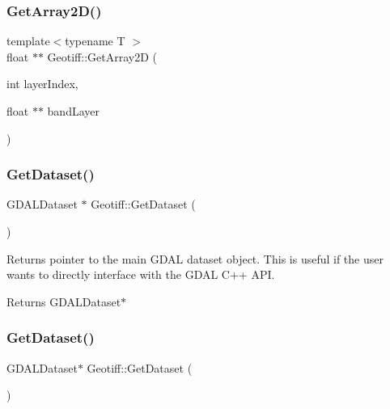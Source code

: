 \mbox{\label{class_geotiff_a922f027c08e3748239031119fb103543}} 
\subsubsection{\texorpdfstring{Get\+Array2\+D()}{GetArray2D()}\hspace{0.1cm}{\footnotesize\ttfamily [2/2]}}
{\footnotesize\ttfamily template$<$typename T $>$ \\
float $\ast$$\ast$ Geotiff\+::\+Get\+Array2D (\begin{DoxyParamCaption}\item[{int}]{layer\+Index,  }\item[{float $\ast$$\ast$}]{band\+Layer }\end{DoxyParamCaption})}

\mbox{\label{class_geotiff_a7494d80a2bf47222aabeb18cb8ff105b}} 
\subsubsection{\texorpdfstring{Get\+Dataset()}{GetDataset()}\hspace{0.1cm}{\footnotesize\ttfamily [1/2]}}
{\footnotesize\ttfamily G\+D\+A\+L\+Dataset $\ast$ Geotiff\+::\+Get\+Dataset (\begin{DoxyParamCaption}{ }\end{DoxyParamCaption})}



Returns pointer to the main G\+D\+AL dataset object. This is useful if the user wants to directly interface with the G\+D\+AL C++ A\+PI. 

\begin{DoxyReturn}{Returns}
G\+D\+A\+L\+Dataset$\ast$ 
\end{DoxyReturn}
\mbox{\label{class_geotiff_a43fe1ff2bee73acc6169b7d35d883201}} 
\subsubsection{\texorpdfstring{Get\+Dataset()}{GetDataset()}\hspace{0.1cm}{\footnotesize\ttfamily [2/2]}}
{\footnotesize\ttfamily G\+D\+A\+L\+Dataset$\ast$ Geotiff\+::\+Get\+Dataset (\begin{DoxyParamCaption}{ }\end{DoxyParamCaption})}

